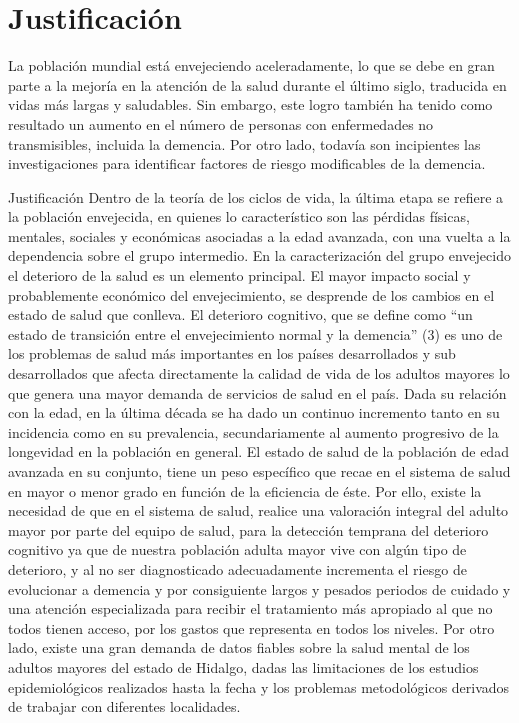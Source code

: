 
\section{Justificaci\'on}

La poblaci\'on mundial est\'a envejeciendo aceleradamente, lo que se debe en gran parte a la 
mejor\'ia en la atenci\'on de la salud durante el \'ultimo siglo, traducida en vidas m\'as 
largas y saludables. Sin embargo, este logro tambi\'en ha tenido como resultado un aumento en el 
n\'umero de personas con enfermedades no transmisibles, incluida la demencia.
Por otro lado, todav\'ia son incipientes las investigaciones para identificar 
factores de riesgo modificables de la demencia.\cite{PlanAlzheimer04}

Justificación 
Dentro de la teoría de los ciclos de vida, la última etapa se refiere a la población envejecida, en quienes lo característico son las pérdidas físicas, mentales, sociales y económicas asociadas a la edad avanzada, con una vuelta a la dependencia sobre el grupo intermedio. En la caracterización del grupo envejecido el deterioro de la salud es un elemento principal. El mayor impacto social y probablemente económico del envejecimiento, se desprende de los cambios en el estado de salud que conlleva.
El deterioro cognitivo, que se define como “un estado de transición entre el envejecimiento normal y la demencia” (3) es uno de los problemas de salud más importantes en los países desarrollados y sub desarrollados que afecta directamente la calidad de vida de los adultos mayores lo que genera una mayor demanda de servicios de salud en el país.
Dada su relación con la edad, en la última década se ha dado un continuo incremento tanto en su incidencia como en su prevalencia, secundariamente al aumento progresivo de la longevidad en la población en general.
El estado de salud de la población de edad avanzada en su conjunto, tiene un peso específico que recae en el sistema de salud en mayor o menor grado en función de la eficiencia de éste. Por ello, existe la necesidad de que en el sistema de salud, realice una valoración integral del adulto mayor por parte del equipo de salud, para la detección temprana del deterioro cognitivo ya que  de nuestra población adulta mayor vive con algún tipo de deterioro, y al no ser diagnosticado adecuadamente incrementa el riesgo de evolucionar a demencia y por consiguiente largos y pesados periodos de cuidado y una atención especializada para recibir el tratamiento más apropiado al que no todos tienen acceso, por los gastos que representa en todos los niveles. Por otro lado, existe una gran demanda de datos fiables sobre la salud mental de los adultos mayores del estado de Hidalgo, dadas las limitaciones de los estudios epidemiológicos realizados hasta la fecha y los problemas metodológicos derivados de trabajar con diferentes localidades.


